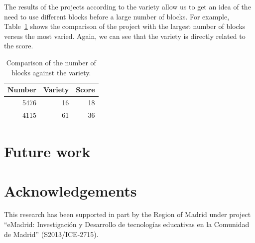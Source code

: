 \documentclass[a4paper]{article}
\begin{document}
The results of the projects according to the variety allow us to get an idea of the need to use different blocks before a large number of blocks. For example, Table~\ref{tab:comp-num-var} shows the comparison of the project with the largest number of blocks versus the most varied. Again, we can see that the variety is directly related to the score.

\begin{table}
\begin{center}
\caption{Comparison of the number of blocks against the variety.}

\bigskip
\label{tab:comp-num-var}

\begin{tabular}{|r|r|r|}
\hline
Number & Variety & Score \\ \hline
5476 & 16 & 18\\ \hline
4115 & 61 & 36\\ \hline
\end{tabular}
\end{center}
\end{table}

\section{Future work}


\section*{Acknowledgements}

This research has been supported in part 
by the Region of Madrid under project ``eMadrid:
Investigación y Desarrollo de tecnologías educativas en la
Comunidad de Madrid'' (S2013/ICE-2715).


 

\end{document}
